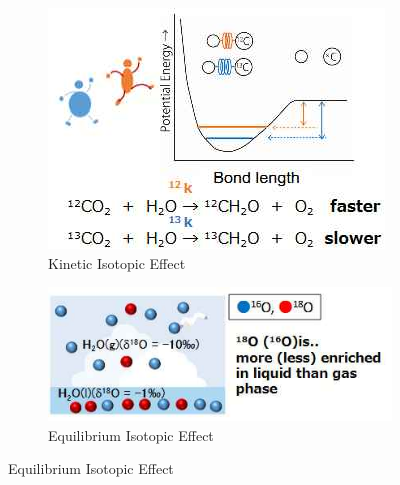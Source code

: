 \documentclass[]{article}
\begin{document}
\begin{figure}[H]
	\caption{Isotopic Effects}\label{fig:IsotopicEffects}
	\begin{subfigure}[t]{0.45\textwidth}
		\caption{Kinetic Isotopic Effect}\label{fig:KineticIsotopicEffects}
		\includegraphics[width=\textwidth]{KineticIsotope1}
	\end{subfigure}
	\begin{subfigure}[t]{0.45\textwidth}
		\caption{Equilibrium Isotopic Effect}\label{fig:EquilibriumIsotopicEffects}
		\includegraphics[width=\textwidth]{EquilibriumIsotopicEffect}
	\end{subfigure}
\end{figure}
\end{document}
